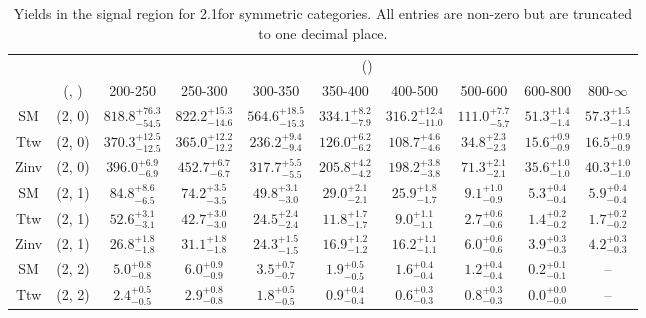 \begin{table}[h!]
\tiny
\centering
\caption{Yields in the signal region for 2.1\ifb for symmetric categories. All entries are non-zero but are truncated to one decimal place.\label{tab:yieldsnodata_sig_comb_sym}}
\begin{tabular}
{cccccccccc}
	\hline\hline
	&	& \multicolumn{8}{c}{\scalht (\gev)}\\ 
	&	 (\njet, \nb) & 200-250 & 250-300 & 300-350 & 350-400 & 400-500 & 500-600 & 600-800 & 800-$\infty$ \\ [0.8ex] 
\hline
	SM & (2, 0) & $818.8^{+ 76.3 }_{- 54.5 }$ & $822.2^{+ 15.3 }_{- 14.6 }$ & $564.6^{+ 18.5 }_{- 15.3 }$ & $334.1^{+ 8.2 }_{- 7.9 }$ & $316.2^{+ 12.4 }_{- 11.0 }$ & $111.0^{+ 7.7 }_{- 5.7 }$ & $51.3^{+ 1.4 }_{- 1.4 }$ & $57.3^{+ 1.5 }_{- 1.4 }$ \\[0.5ex] 
	Ttw & (2, 0) & $370.3^{+ 12.5 }_{- 12.5 }$ & $365.0^{+ 12.2 }_{- 12.2 }$ & $236.2^{+ 9.4 }_{- 9.4 }$ & $126.0^{+ 6.2 }_{- 6.2 }$ & $108.7^{+ 4.6 }_{- 4.6 }$ & $34.8^{+ 2.3 }_{- 2.3 }$ & $15.6^{+ 0.9 }_{- 0.9 }$ & $16.5^{+ 0.9 }_{- 0.9 }$ \\[0.5ex] 
	Zinv & (2, 0) & $396.0^{+ 6.9 }_{- 6.9 }$ & $452.7^{+ 6.7 }_{- 6.7 }$ & $317.7^{+ 5.5 }_{- 5.5 }$ & $205.8^{+ 4.2 }_{- 4.2 }$ & $198.2^{+ 3.8 }_{- 3.8 }$ & $71.3^{+ 2.1 }_{- 2.1 }$ & $35.6^{+ 1.0 }_{- 1.0 }$ & $40.3^{+ 1.0 }_{- 1.0 }$ \\[0.5ex] 
	SM & (2, 1) & $84.8^{+ 8.6 }_{- 6.5 }$ & $74.2^{+ 3.5 }_{- 3.5 }$ & $49.8^{+ 3.1 }_{- 3.0 }$ & $29.0^{+ 2.1 }_{- 2.1 }$ & $25.9^{+ 1.8 }_{- 1.7 }$ & $9.1^{+ 1.0 }_{- 0.9 }$ & $5.3^{+ 0.4 }_{- 0.4 }$ & $5.9^{+ 0.4 }_{- 0.4 }$ \\[0.5ex] 
	Ttw & (2, 1) & $52.6^{+ 3.1 }_{- 3.1 }$ & $42.7^{+ 3.0 }_{- 3.0 }$ & $24.5^{+ 2.4 }_{- 2.4 }$ & $11.8^{+ 1.7 }_{- 1.7 }$ & $9.0^{+ 1.1 }_{- 1.1 }$ & $2.7^{+ 0.6 }_{- 0.6 }$ & $1.4^{+ 0.2 }_{- 0.2 }$ & $1.7^{+ 0.2 }_{- 0.2 }$ \\[0.5ex] 
	Zinv & (2, 1) & $26.8^{+ 1.8 }_{- 1.8 }$ & $31.1^{+ 1.8 }_{- 1.8 }$ & $24.3^{+ 1.5 }_{- 1.5 }$ & $16.9^{+ 1.2 }_{- 1.2 }$ & $16.2^{+ 1.1 }_{- 1.1 }$ & $6.0^{+ 0.6 }_{- 0.6 }$ & $3.9^{+ 0.3 }_{- 0.3 }$ & $4.2^{+ 0.3 }_{- 0.3 }$ \\[0.5ex] 
	SM & (2, 2) & $5.0^{+ 0.8 }_{- 0.8 }$ & $6.0^{+ 0.9 }_{- 0.9 }$ & $3.5^{+ 0.7 }_{- 0.7 }$ & $1.9^{+ 0.5 }_{- 0.5 }$ & $1.6^{+ 0.4 }_{- 0.4 }$ & $1.2^{+ 0.4 }_{- 0.4 }$ & $0.2^{+ 0.1 }_{- 0.1 }$ & -- \\[0.5ex] 
	Ttw & (2, 2) & $2.4^{+ 0.5 }_{- 0.5 }$ & $2.9^{+ 0.8 }_{- 0.8 }$ & $1.8^{+ 0.5 }_{- 0.5 }$ & $0.9^{+ 0.4 }_{- 0.4 }$ & $0.6^{+ 0.3 }_{- 0.3 }$ & $0.8^{+ 0.3 }_{- 0.3 }$ & $0.0^{+ 0.0 }_{- 0.0 }$ & -- \\[0.5ex] 

\end{tabular}
\end{table}

